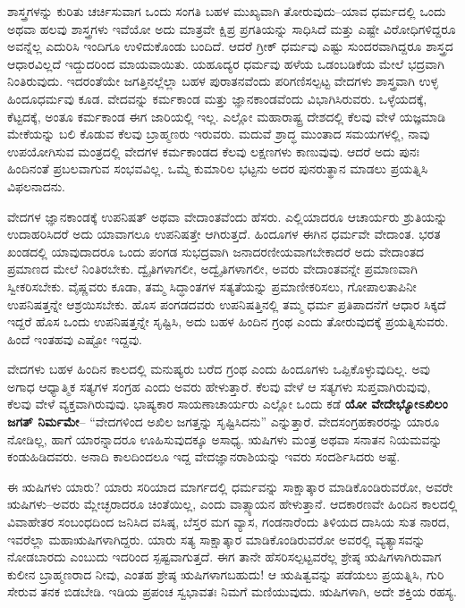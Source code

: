 ಶಾಸ್ತ್ರಗಳನ್ನು ಕುರಿತು ಚರ್ಚಿಸುವಾಗ ಒಂದು ಸಂಗತಿ ಬಹಳ ಮುಖ್ಯವಾಗಿ ತೋರುವುದು–ಯಾವ ಧರ್ಮದಲ್ಲಿ ಒಂದು ಅಥವಾ ಹಲವು ಶಾಸ್ತ್ರಗಳು ಇವೆಯೋ ಅದು ಮಾತ್ರವೇ ಕ್ಷಿಪ್ರ ಪ್ರಗತಿಯನ್ನು ಸಾಧಿಸಿದೆ ಮತ್ತು ಎಷ್ಟೇ ವಿರೋಧಿಗಳಿದ್ದರೂ ಅವನ್ನೆಲ್ಲ ಎದುರಿಸಿ ಇಂದಿಗೂ ಉಳಿದುಕೊಂಡು ಬಂದಿದೆ. ಆದರೆ ಗ್ರೀಕ್​ ಧರ್ಮವು ಎಷ್ಟು ಸುಂದರವಾಗಿದ್ದರೂ ಶಾಸ್ತ್ರದ ಆಧಾರವಿಲ್ಲದೆ ಇದ್ದುದರಿಂದ ಮಾಯವಾಯಿತು. ಯಹೂದ್ಯರ ಧರ್ಮವು ಹಳೆಯ ಒಡಂಬಡಿಕೆಯ ಮೇಲೆ ಭದ್ರವಾಗಿ ನಿಂತಿರುವುದು. ಇದರಂತೆಯೇ ಜಗತ್ತಿನಲ್ಲೆಲ್ಲಾ ಬಹಳ ಪುರಾತನವೆಂದು ಪರಿಗಣಿಸಲ್ಪಟ್ಟ ವೇದಗಳು ಶಾಸ್ತ್ರವಾಗಿ ಉಳ್ಳ ಹಿಂದೂಧರ್ಮವು ಕೂಡ. ವೇದವನ್ನು ಕರ್ಮಕಾಂಡ ಮತ್ತು ಜ್ಞಾನಕಾಂಡವೆಂದು ವಿಭಾಗಿಸಿರುವರು. ಒಳ್ಳೆಯದಕ್ಕೆ, ಕೆಟ್ಟದಕ್ಕೆ, ಅಂತೂ ಕರ್ಮಕಾಂಡ ಈಗ ಜಾರಿಯಲ್ಲಿ ಇಲ್ಲ. ಎಲ್ಲೋ ಮಹಾರಾಷ್ಟ್ರ ದೇಶದಲ್ಲಿ ಕೆಲವು ವೇಳೆ ಯಜ್ಞಮಾಡಿ ಮೇಕೆಯನ್ನು ಬಲಿ ಕೊಡುವ ಕೆಲವು ಬ್ರಾಹ್ಮಣರು ಇರುವರು. ಮದುವೆ ಶ್ರಾದ್ಧ ಮುಂತಾದ ಸಮಯಗಳಲ್ಲಿ, ನಾವು ಉಪಯೋಗಿಸುವ ಮಂತ್ರದಲ್ಲಿ ವೇದಗಳ ಕರ್ಮಕಾಂಡದ ಕೆಲವು ಲಕ್ಷಣಗಳು ಕಾಣುವುವು. ಆದರೆ ಅದು ಪುನಃ ಹಿಂದಿನಂತೆ ಪ್ರಬಲವಾಗುವ ಸಂಭವವಿಲ್ಲ. ಒಮ್ಮೆ ಕುಮಾರಿಲ ಭಟ್ಟನು ಅದರ ಪುನರುತ್ಥಾನ ಮಾಡಲು ಪ್ರಯತ್ನಿಸಿ ವಿಫಲನಾದನು. 

ವೇದಗಳ ಜ್ಞಾನಕಾಂಡಕ್ಕೆ ಉಪನಿಷತ್​ ಅಥವಾ ವೇದಾಂತವೆಂದು ಹೆಸರು. ಎಲ್ಲಿಯಾದರೂ ಆಚಾರ್ಯರು ಶ್ರುತಿಯನ್ನು ಉದಾಹರಿಸಿದರೆ ಅದು ಯಾವಾಗಲೂ ಉಪನಿಷತ್ತೇ ಆಗಿರುತ್ತದೆ. ಹಿಂದೂಗಳ ಈಗಿನ ಧರ್ಮವೇ ವೇದಾಂತ. ಭರತ ಖಂಡದಲ್ಲಿ ಯಾವುದಾದರೂ ಒಂದು ಪಂಗಡ ಸುಭದ್ರವಾಗಿ ಜನಾದರಣೀಯವಾಗಬೇಕಾದರೆ ಅದು ವೇದಾಂತದ ಪ್ರಮಾಣದ ಮೇಲೆ ನಿಂತಿರಬೇಕು. ದ್ವೈತಿಗಳಾಗಲೀ, ಅದ್ವೈತಿಗಳಾಗಲೀ, ಅವರು ವೇದಾಂತವನ್ನೇ ಪ್ರಮಾಣವಾಗಿ ಸ್ವೀಕರಿಸಬೇಕು. ವೈಷ್ಣವರು ಕೂಡಾ, ತಮ್ಮ ಸಿದ್ಧಾಂತಗಳ ಸತ್ಯತೆಯನ್ನು ಪ್ರಮಾಣೀಕರಿಸಲು, ಗೋಪಾಲತಾಪಿನೀ ಉಪನಿಷತ್ತನ್ನೇ ಆಶ್ರಯಿಸಬೇಕು. ಹೊಸ ಪಂಗಡದವರು ಉಪನಿಷತ್ತಿನಲ್ಲಿ ತಮ್ಮ ಧರ್ಮ ಪ್ರತಿಪಾದನೆಗೆ ಆಧಾರ ಸಿಕ್ಕದೆ ಇದ್ದರೆ ಹೊಸ ಒಂದು ಉಪನಿಷತ್ತನ್ನೇ ಸೃಷ್ಟಿಸಿ, ಅದು ಬಹಳ ಹಿಂದಿನ ಗ್ರಂಥ ಎಂದು ತೋರುವುದಕ್ಕೆ ಪ್ರಯತ್ನಿಸುವರು. ಹಿಂದೆ ಇಂತಹವು ಎಷ್ಟೋ ಇದ್ದವು. 

ವೇದಗಳು ಬಹಳ ಹಿಂದಿನ ಕಾಲದಲ್ಲಿ ಮನುಷ್ಯರು ಬರೆದ ಗ್ರಂಥ ಎಂದು ಹಿಂದೂಗಳು ಒಪ್ಪಿಕೊಳ್ಳುವುದಿಲ್ಲ. ಅವು ಅಗಾಧ ಆಧ್ಯಾತ್ಮಿಕ ಸತ್ಯಗಳ ಸಂಗ್ರಹ ಎಂದು ಅವರು ಹೇಳುತ್ತಾರೆ. ಕೆಲವು ವೇಳೆ ಆ ಸತ್ಯಗಳು ಸುಪ್ತವಾಗಿರುವುವು, ಕೆಲವು ವೇಳೆ ವ್ಯಕ್ತವಾಗಿರುವುವು. ಭಾಷ್ಯಕಾರ ಸಾಯಣಾಚಾರ್ಯರು ಎಲ್ಲೋ ಒಂದು ಕಡೆ \textbf{ಯೋ ವೇದೇಭ್ಯೋಽಖಿಲಂ ಜಗತ್​ ನಿರ್ಮಮೇ}– “ವೇದಗಳಿಂದ ಅಖಿಲ ಜಗತ್ತನ್ನು ಸೃಷ್ಟಿಸಿದನು” ಎನ್ನುತ್ತಾರೆ. ವೇದಸಂಗ್ರಹಕಾರರನ್ನು ಯಾರೂ ನೋಡಿಲ್ಲ, ಹಾಗೆ ಯಾರನ್ನಾದರೂ ಊಹಿಸುವುದಕ್ಕೂ ಅಸಾಧ್ಯ. ಋಷಿಗಳು ಮಂತ್ರ ಅಥವಾ ಸನಾತನ ನಿಯಮವನ್ನು ಕಂಡುಹಿಡಿದವರು. ಅನಾದಿ ಕಾಲದಿಂದಲೂ ಇದ್ದ ವೇದಜ್ಞಾನರಾಶಿಯನ್ನು ಇವರು ಸಂದರ್ಶಿಸಿದರು ಅಷ್ಟೆ. 

ಈ ಋಷಿಗಳು ಯಾರು? ಯಾರು ಸರಿಯಾದ ಮಾರ್ಗದಲ್ಲಿ ಧರ್ಮವನ್ನು ಸಾಕ್ಷಾತ್ಕಾರ ಮಾಡಿಕೊಂಡಿರುವರೋ, ಅವರೇ ಋಷಿಗಳು–ಅವರು ಮ್ಲೇಚ್ಛರಾದರೂ ಚಿಂತೆಯಿಲ್ಲ, ಎಂದು ವಾತ್ಸ್ಯಾಯನ ಹೇಳುತ್ತಾನೆ. ಆದಕಾರಣವೇ ಹಿಂದಿನ ಕಾಲದಲ್ಲಿ ವಿವಾಹೇತರ ಸಂಬಂಧದಿಂದ ಜನಿಸಿದ ವಸಿಷ್ಠ, ಬೆಸ್ತರ ಮಗ ವ್ಯಾಸ, ಗಂಡನಾರೆಂದು ತಿಳಿಯದ ದಾಸಿಯ ಸುತ ನಾರದ, ಇವರೆಲ್ಲಾ ಮಹಾಋಷಿಗಳಾಗಿದ್ದರು. ಯಾರು ಸತ್ಯ ಸಾಕ್ಷಾತ್ಕಾರ ಮಾಡಿಕೊಂಡಿರುವರೋ ಅವರಲ್ಲಿ ವ್ಯತ್ಯಾಸವನ್ನು ನೋಡಬಾರದು ಎಂಬುದು ಇದರಿಂದ ಸ್ಪಷ್ಟವಾಗುತ್ತದೆ. ಈಗ ತಾನೇ ಹೆಸರಿಸಲ್ಪಟ್ಟವರೆಲ್ಲ ಶ್ರೇಷ್ಠ ಋಷಿಗಳಾಗಿರುವಾಗ ಕುಲೀನ ಬ್ರಾಹ್ಮಣರಾದ ನೀವು, ಎಂತಹ ಶ್ರೇಷ್ಠ ಋಷಿಗಳಾಗಬಹುದು! ಆ ಋಷಿತ್ವವನ್ನು ಪಡೆಯಲು ಪ್ರಯತ್ನಿಸಿ, ಗುರಿ ಸೇರುವ ತನಕ ಬಿಡಬೇಡಿ. ಇಡಿಯ ಪ್ರಪಂಚ ಸ್ವಭಾವತಃ ನಿಮಗೆ ಮಣಿಯುವುದು. ಋಷಿಗಳಾಗಿ, ಅದೇ ಶಕ್ತಿಯ ರಹಸ್ಯ. 

